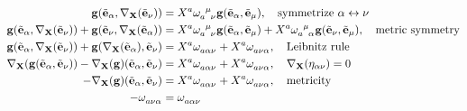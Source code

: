 \begin{align*}
    \vb g\qty(\tilde{\vb e}_\alpha,\nabla_{\vb X}\qty(\tilde{\vb e}_\nu))&=X^a\tensor{\omega}{_a^\mu_\nu}\vb g\qty(\tilde{\vb e}_\alpha,\tilde{\vb e}_\mu),\ \ \ \textnormal{symmetrize }\alpha\leftrightarrow\nu\\
    \vb g\qty(\tilde{\vb e}_\alpha,\nabla_{\vb X}\qty(\tilde{\vb e}_\nu))+\vb g\qty(\tilde{\vb e}_\nu,\nabla_{\vb X}\qty(\tilde{\vb e}_\alpha))&=X^a\tensor{\omega}{_a^\mu_\nu}\vb g\qty(\tilde{\vb e}_\alpha,\tilde{\vb e}_\mu)+X^a\tensor{\omega}{_a^\mu_\alpha}\vb g\qty(\tilde{\vb e}_\nu,\tilde{\vb e}_\mu),\ \ \ \textnormal{metric symmetry}\\
    \vb g\qty(\tilde{\vb e}_\alpha,\nabla_{\vb X}\qty(\tilde{\vb e}_\nu))+\vb g\qty(\nabla_{\vb X}\qty(\tilde{\vb e}_\alpha),\tilde{\vb e}_\nu)&=X^a\tensor{\omega}{_a_\alpha_\nu}+X^a\tensor{\omega}{_a_\nu_\alpha},\ \ \ \textnormal{Leibnitz rule}\\
    \nabla_{\vb X}\qty(\vb g\qty(\tilde{\vb e}_\alpha,\tilde{\vb e}_\nu))-\nabla_{\vb X}\qty(\vb g)\qty(\tilde{\vb e}_\alpha,\tilde{\vb e}_\nu)&=X^a\tensor{\omega}{_a_\alpha_\nu}+X^a\tensor{\omega}{_a_\nu_\alpha},\ \ \ \nabla_{\vb X}\qty(\eta_{\alpha\nu})=0\\
    -\nabla_{\vb X}\qty(\vb g)\qty(\tilde{\vb e}_\alpha,\tilde{\vb e}_\nu)&=X^a\tensor{\omega}{_a_\alpha_\nu}+X^a\tensor{\omega}{_a_\nu_\alpha},\ \ \ \textnormal{metricity}\\
    -\tensor{\omega}{_a_\nu_\alpha}&=\tensor{\omega}{_a_\alpha_\nu}
\end{align*}

